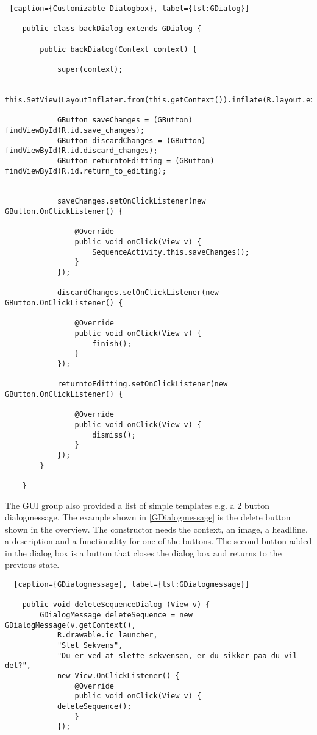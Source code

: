 \begin{lstlisting} [caption={Customizable Dialogbox}, label={lst:GDialog}]

    public class backDialog extends GDialog {

        public backDialog(Context context) {

            super(context);

            this.SetView(LayoutInflater.from(this.getContext()).inflate(R.layout.exit_sequence_dialog,null));

            GButton saveChanges = (GButton) findViewById(R.id.save_changes);
            GButton discardChanges = (GButton) findViewById(R.id.discard_changes);
            GButton returntoEditting = (GButton) findViewById(R.id.return_to_editing);


            saveChanges.setOnClickListener(new GButton.OnClickListener() {

                @Override
                public void onClick(View v) {
                    SequenceActivity.this.saveChanges();
                }
            });

            discardChanges.setOnClickListener(new GButton.OnClickListener() {

                @Override
                public void onClick(View v) {
                    finish();
                }
            });

            returntoEditting.setOnClickListener(new GButton.OnClickListener() {

                @Override
                public void onClick(View v) {
                    dismiss();
                }
            });
        }

    }
\end{lstlisting}

The GUI group also provided a list of simple templates e.g. a 2 button dialogmessage. The example shown in \ref{GDialogmessage} is the delete button shown in the overview. The constructor needs the context, an image, a headlline, a description and a functionality for one of the buttons. The second button added in the dialog box is a button that closes the dialog box and returns to the previous state.

\begin{lstlisting}  [caption={GDialogmessage}, label={lst:GDialogmessage}]

    public void deleteSequenceDialog (View v) {
        GDialogMessage deleteSequence = new GDialogMessage(v.getContext(),
            R.drawable.ic_launcher,
            "Slet Sekvens",
            "Du er ved at slette sekvensen, er du sikker paa du vil det?",
            new View.OnClickListener() {
                @Override
                public void onClick(View v) {
			deleteSequence();
                }
            });

\end{lstlisting}